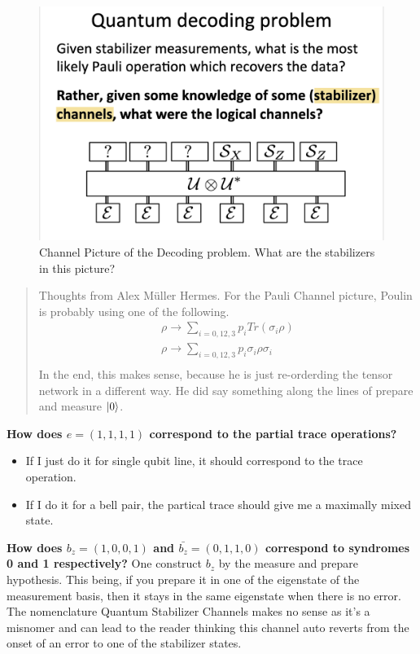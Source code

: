 \documentclass[%
 reprint,
amsmath,amssymb,
aps,
onecolumn,
]{revtex4-2}
\begin{document}
\begin{figure}[ht]
    \centering
    \includegraphics[scale=0.3]{../assets/decoding_channel_picture.png}
    \caption{Channel Picture of the Decoding problem. \textcolor{BrickRed}{What are the stabilizers in this picture?}}
    \label{fig:decode-channel-picture}
\end{figure}


\begin{quote}
    Thoughts from Alex Müller Hermes. For the Pauli Channel picture, Poulin is probably using one of the following. 
    \begin{align*}
        \rho \rightarrow \sum_{i = {0,1 2,3}} p_i Tr(\sigma_i \rho) \\
        \rho \rightarrow \sum_{i = {0,1 2,3}} p_i  \sigma_i \rho \sigma_i  \\
    \end{align*}
    In the end, this makes sense, because he is just re-orderding the tensor network in a different way. He did say something along the lines of prepare and measure $\ket{0}$.
\end{quote}

\textbf{How does $e = (1,1,1,1)$ correspond to the partial trace operations?}
\begin{itemize}
    \item If I just do it for single qubit line, it should correspond to the trace operation.
    \item If I do it for a bell pair, the partical trace should give me a maximally mixed state.
\end{itemize}

\textbf{How does $b_z =(1,0,0,1)$ and $\bar{b_z} = (0,1,1,0)$ correspond to syndromes 0 and 1 respectively?}
One construct $b_z$ by the measure and prepare hypothesis. This being, if you prepare it in one of the eigenstate of the measurement basis, then it stays in the same eigenstate when there is no error. The nomenclature Quantum Stabilizer Channels makes no sense as it's a misnomer and can lead to the reader thinking this channel auto reverts from the onset of an error to one of the stabilizer states. 
\end{document}
